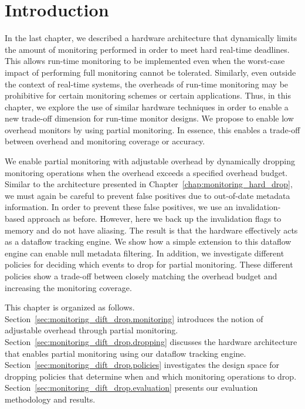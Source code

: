 \section{Introduction}
\label{sec:monitoring_dift_drop.introduction}

In the last chapter, we described a hardware architecture that dynamically
limits the amount of monitoring performed in order to meet hard real-time
deadlines. This allows run-time monitoring to be implemented even when the
worst-case impact of performing full monitoring cannot be tolerated. Similarly,
even outside the context of real-time systems, the overheads of run-time
monitoring may be prohibitive for certain monitoring schemes or certain
applications. Thus, in this chapter, we explore the use of similar hardware
techniques in order to enable a new trade-off dimension for run-time monitor
designs.  We propose to enable low overhead monitors by using partial
monitoring. In essence, this enables a trade-off between overhead and
monitoring coverage or accuracy. 

We enable partial monitoring with adjustable overhead by dynamically dropping
monitoring operations when the overhead exceeds a specified overhead budget.
Similar to the architecture presented in
Chapter~\ref{chap:monitoring_hard_drop}, we must again be careful to prevent
false positives due to out-of-date metadata information. In order to prevent
these false positives, we use an invalidation-based approach as before.
However, here we back up the invalidation flags to memory and do not have
aliasing. The result is that the hardware effectively acts as a dataflow
tracking engine. We show how a simple extension to this dataflow engine can
enable null metadata filtering. In addition, we investigate different policies
for deciding which events to drop for partial monitoring.  These different
policies show a trade-off between closely matching the overhead budget and
increasing the monitoring coverage.

This chapter is organized as follows.
Section~\ref{sec:monitoring_dift_drop.monitoring} introduces the notion of
adjustable overhead through partial monitoring.
Section~\ref{sec:monitoring_dift_drop.dropping} discusses the hardware
architecture that enables partial monitoring using our dataflow tracking
engine.  Section~\ref{sec:monitoring_dift_drop.policies} investigates the
design space for dropping policies that determine when and which monitoring
operations to drop.  Section~\ref{sec:monitoring_dift_drop.evaluation} presents
our evaluation methodology and results. 

